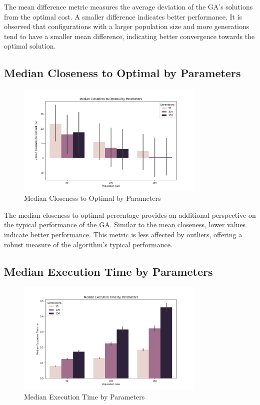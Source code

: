 \documentclass[
]{article}
\begin{document}
    The mean difference metric measures the average deviation of the GA's solutions from the optimal cost. A smaller difference indicates better performance. It is observed that configurations with a larger population size and more generations tend to have a smaller mean difference, indicating better convergence towards the optimal solution.

    \subsection{Median Closeness to Optimal by Parameters}\label{subsec:median-closeness-to-optimal-by-parameters}
    \begin{figure}[H]
        \centering
        \includegraphics[width=0.8\textwidth]{genetic_algorithm/median_closeness_to_optimal.png}
        \caption{Median Closeness to Optimal by Parameters}
        \label{fig:median_closeness_to_optimal_ga}
    \end{figure}

    The median closeness to optimal percentage provides an additional perspective on the typical performance of the GA. Similar to the mean closeness, lower values indicate better performance. This metric is less affected by outliers, offering a robust measure of the algorithm's typical performance.

    \subsection{Median Execution Time by Parameters}\label{subsec:median-execution-time-by-parameters}
    \begin{figure}[H]
        \centering
        \includegraphics[width=0.8\textwidth]{genetic_algorithm/median_execution_time.png}
        \caption{Median Execution Time by Parameters}
        \label{fig:median_execution_time_ga}
    \end{figure}
\end{document}
